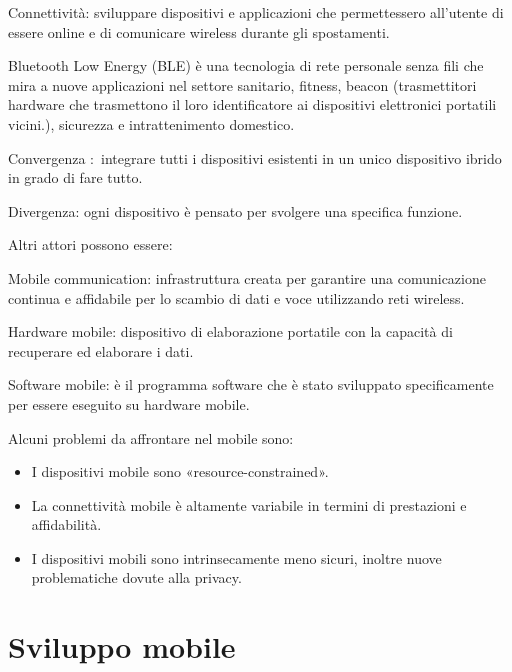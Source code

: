 \documentclass[
]{article}
\providecommand{\tightlist}{%
  \setlength{\itemsep}{0pt}\setlength{\parskip}{0pt}}
\begin{document}
{}

{Connettività}{: sviluppare dispositivi e applicazioni che permettessero
all'utente di essere online e di comunicare wireless durante gli
spostamenti.}

{}

{Bluetooth Low Energy (BLE) è una tecnologia di rete personale senza
fili che mira a nuove applicazioni nel settore sanitario, fitness,
beacon (trasmettitori hardware che trasmettono il loro identificatore ai
dispositivi elettronici portatili vicini.), sicurezza e intrattenimento
domestico.}

{}

{Convergenza :}{~integrare tutti i dispositivi esistenti in un unico
dispositivo ibrido in grado di fare tutto.}

{}

{Divergenza}{: ogni dispositivo è pensato per svolgere una specifica
funzione.}

{}

{Altri attori possono essere: }

{Mobile communication}{: infrastruttura creata per garantire una
comunicazione continua e affidabile per lo scambio di dati e voce
utilizzando reti wireless.}

{}

{Hardware mobile}{: dispositivo di elaborazione portatile con la
capacità di recuperare ed elaborare i dati.}

{}

{Software mobile}{: è il programma software che è stato sviluppato
specificamente per essere eseguito su hardware mobile.}

{}

{}

{Alcuni problemi da affrontare nel mobile sono:}

\begin{itemize}
\tightlist
\item
  {I dispositivi mobile sono «resource-constrained».}
\item
  {La connettività mobile è altamente variabile in termini di
  prestazioni e affidabilità.}
\item
  {I dispositivi mobili sono intrinsecamente meno sicuri, inoltre nuove
  problematiche dovute alla privacy.}
\end{itemize}

\section{\texorpdfstring{{Sviluppo
mobile}}{Sviluppo mobile}}\label{h.tyh2meq37x82}
\end{document}
